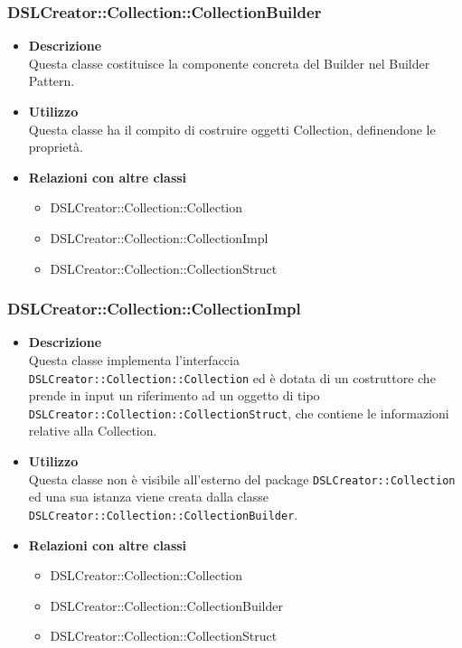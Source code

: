  \subsubsection{DSLCreator::Collection::CollectionBuilder}
                    \begin{itemize}
                        \item \textbf{Descrizione} \hfill \\
                            Questa classe costituisce la componente concreta del Builder nel Builder Pattern.
                        \item \textbf{Utilizzo} \hfill \\
                            Questa classe ha il compito di costruire oggetti Collection, definendone le proprietà.
                        \item \textbf{Relazioni con altre classi}
                            \begin{itemize}
                              \item DSLCreator::Collection::Collection
                              \item DSLCreator::Collection::CollectionImpl
                              \item DSLCreator::Collection::CollectionStruct
                            \end{itemize}
                    \end{itemize}

 \subsubsection{DSLCreator::Collection::CollectionImpl}
                    \begin{itemize}
                        \item \textbf{Descrizione} \hfill \\
                            Questa classe implementa l'interfaccia \texttt{DSLCreator::Collection::Collection} ed è dotata di un costruttore che prende in input un riferimento ad un oggetto di tipo \texttt{DSLCreator::Collection::CollectionStruct}, che contiene le informazioni relative alla Collection.
                        \item \textbf{Utilizzo} \hfill \\
                            Questa classe non è visibile all'esterno del package \texttt{DSLCreator::Collection} ed una sua istanza viene creata dalla classe \texttt{DSLCreator::Collection::CollectionBuilder}.
                        \item \textbf{Relazioni con altre classi}
                            \begin{itemize}
                              \item DSLCreator::Collection::Collection
                              \item DSLCreator::Collection::CollectionBuilder
                              \item DSLCreator::Collection::CollectionStruct
                            \end{itemize}
                    \end{itemize}

